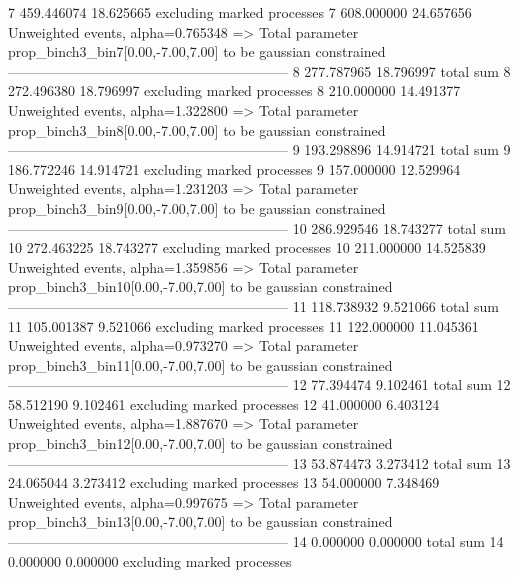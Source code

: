 7          459.446074      18.625665       excluding marked processes    
7          608.000000      24.657656       Unweighted events, alpha=0.765348
  => Total parameter prop_binch3_bin7[0.00,-7.00,7.00] to be gaussian constrained
------------------------------------------------------------
8          277.787965      18.796997       total sum                     
8          272.496380      18.796997       excluding marked processes    
8          210.000000      14.491377       Unweighted events, alpha=1.322800
  => Total parameter prop_binch3_bin8[0.00,-7.00,7.00] to be gaussian constrained
------------------------------------------------------------
9          193.298896      14.914721       total sum                     
9          186.772246      14.914721       excluding marked processes    
9          157.000000      12.529964       Unweighted events, alpha=1.231203
  => Total parameter prop_binch3_bin9[0.00,-7.00,7.00] to be gaussian constrained
------------------------------------------------------------
10         286.929546      18.743277       total sum                     
10         272.463225      18.743277       excluding marked processes    
10         211.000000      14.525839       Unweighted events, alpha=1.359856
  => Total parameter prop_binch3_bin10[0.00,-7.00,7.00] to be gaussian constrained
------------------------------------------------------------
11         118.738932      9.521066        total sum                     
11         105.001387      9.521066        excluding marked processes    
11         122.000000      11.045361       Unweighted events, alpha=0.973270
  => Total parameter prop_binch3_bin11[0.00,-7.00,7.00] to be gaussian constrained
------------------------------------------------------------
12         77.394474       9.102461        total sum                     
12         58.512190       9.102461        excluding marked processes    
12         41.000000       6.403124        Unweighted events, alpha=1.887670
  => Total parameter prop_binch3_bin12[0.00,-7.00,7.00] to be gaussian constrained
------------------------------------------------------------
13         53.874473       3.273412        total sum                     
13         24.065044       3.273412        excluding marked processes    
13         54.000000       7.348469        Unweighted events, alpha=0.997675
  => Total parameter prop_binch3_bin13[0.00,-7.00,7.00] to be gaussian constrained
------------------------------------------------------------
14         0.000000        0.000000        total sum                     
14         0.000000        0.000000        excluding marked processes    
